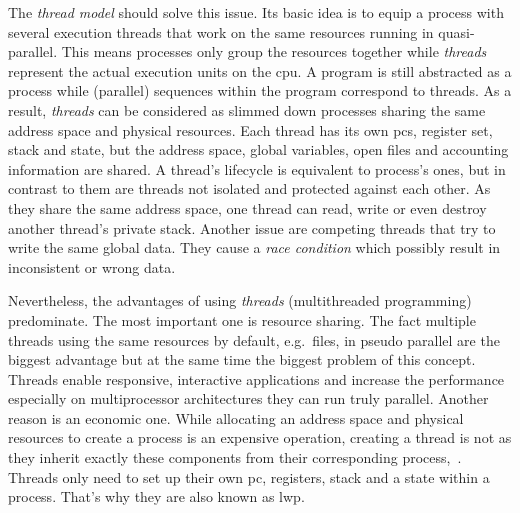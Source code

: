 The \textit{thread model} should solve this issue.
Its basic idea is to equip a process with several execution threads that work on the same resources running in quasi-parallel\cite{tanenbaum-modern-operating-systems}.
This means processes only group the resources together while \textit{threads} represent the actual execution units on the \ac{cpu}\cite{tanenbaum-modern-operating-systems}.
A program is still abstracted as a process while (parallel) sequences within the program correspond to threads.
As a result, \textit{threads} can be considered as slimmed down processes sharing the same address space and physical resources.
Each thread has its own \acp{pc}, register set, stack and state, but the address space, global variables, open files and accounting information are shared\cite{tanenbaum-modern-operating-systems}.
A thread's lifecycle is equivalent to process's ones, but in contrast to them are threads not isolated and protected against each other\cite{glatz2015betriebssysteme}.
As they share the same address space, one thread can read, write or even destroy another thread's private stack\cite{tanenbaum-modern-operating-systems}.
Another issue are competing threads that try to write the same global data.
They cause a \textit{race condition} which possibly result in inconsistent or wrong data\cite{brause2017betriebssysteme}.

Nevertheless, the advantages of using \textit{threads} (multithreaded programming) predominate.
The most important one is resource sharing. 
The fact multiple threads using the same resources by default, e.g.\ files, in pseudo parallel are the biggest advantage but at the same time the biggest problem of this concept.
Threads enable responsive, interactive applications and increase the performance especially on multiprocessor architectures they can run truly parallel\cite{silberschatz2009operating}.
Another reason is an economic one.
While allocating an address space and physical resources to create a process is an expensive operation, creating a thread is not as they inherit exactly these components from their corresponding process\cite{silberschatz2009operating},~\cite{mandl2014Grundkurs}.
Threads only need to set up their own \ac{pc}, registers, stack and a state within a process. 
That's why they are also known as \acf{lwp}\cite{mandl2014Grundkurs}.

